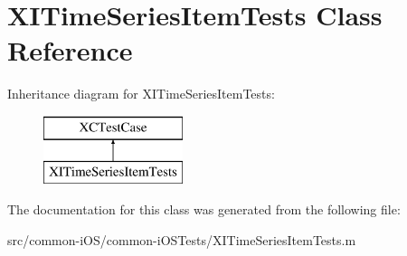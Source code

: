 \hypertarget{interface_x_i_time_series_item_tests}{}\section{X\+I\+Time\+Series\+Item\+Tests Class Reference}
\label{interface_x_i_time_series_item_tests}
Inheritance diagram for X\+I\+Time\+Series\+Item\+Tests\+:\begin{figure}[H]
\begin{center}
\leavevmode
\includegraphics[height=2.000000cm]{interface_x_i_time_series_item_tests}
\end{center}
\end{figure}


The documentation for this class was generated from the following file\+:\begin{DoxyCompactItemize}
\item 
src/common-\/i\+O\+S/common-\/i\+O\+S\+Tests/X\+I\+Time\+Series\+Item\+Tests.\+m\end{DoxyCompactItemize}
